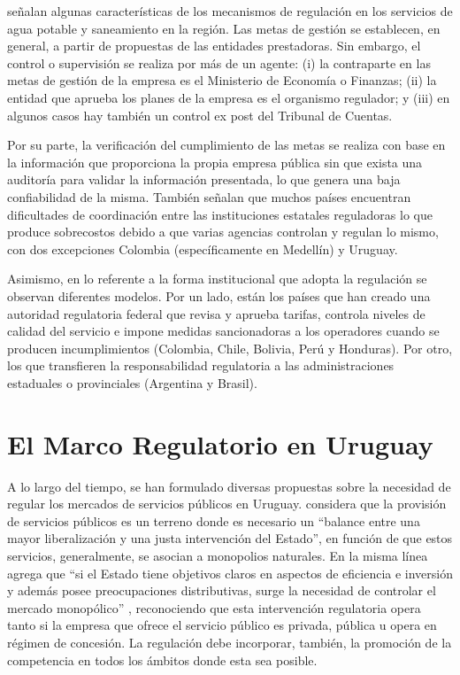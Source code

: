 \documentclass[
  12pt,
  spanish,
]{book}
\begin{document}
\citet{Rozas2013} señalan algunas características de los mecanismos de
regulación en los servicios de agua potable y saneamiento en la región.
Las metas de gestión se establecen, en general, a partir de propuestas
de las entidades prestadoras. Sin embargo, el control o supervisión se
realiza por más de un agente: (i) la contraparte en las metas de gestión
de la empresa es el Ministerio de Economía o Finanzas; (ii) la entidad
que aprueba los planes de la empresa es el organismo regulador; y (iii)
en algunos casos hay también un control ex post del Tribunal de Cuentas.

Por su parte, la verificación del cumplimiento de las metas se realiza
con base en la información que proporciona la propia empresa pública sin
que exista una auditoría para validar la información presentada, lo que
genera una baja confiabilidad de la misma. También señalan que muchos
países encuentran dificultades de coordinación entre las instituciones
estatales reguladoras lo que produce sobrecostos debido a que varias
agencias controlan y regulan lo mismo, con dos excepciones Colombia
(específicamente en Medellín) y Uruguay.

Asimismo, en lo referente a la forma institucional que adopta la
regulación se observan diferentes modelos. Por un lado, están los países
que han creado una autoridad regulatoria federal que revisa y aprueba
tarifas, controla niveles de calidad del servicio e impone medidas
sancionadoras a los operadores cuando se producen incumplimientos
(Colombia, Chile, Bolivia, Perú y Honduras). Por otro, los que
transfieren la responsabilidad regulatoria a las administraciones
estaduales o provinciales (Argentina y Brasil).

\hypertarget{el-marco-regulatorio-en-uruguay}{%
\section{El Marco Regulatorio en
Uruguay}\label{el-marco-regulatorio-en-uruguay}}

A lo largo del tiempo, se han formulado diversas propuestas sobre la
necesidad de regular los mercados de servicios públicos en Uruguay.
\citet{Bergara2001} considera que la provisión de servicios públicos es
un terreno donde es necesario un ``balance entre una mayor
liberalización y una justa intervención del Estado'', en función de que
estos servicios, generalmente, se asocian a monopolios naturales. En la
misma línea agrega que ``si el Estado tiene objetivos claros en aspectos
de eficiencia e inversión y además posee preocupaciones distributivas,
surge la necesidad de controlar el mercado monopólico''
\citep[p.~38]{Bergara2001}, reconociendo que esta intervención
regulatoria opera tanto si la empresa que ofrece el servicio público es
privada, pública u opera en régimen de concesión. La regulación debe
incorporar, también, la promoción de la competencia en todos los ámbitos
donde esta sea posible.
\end{document}
